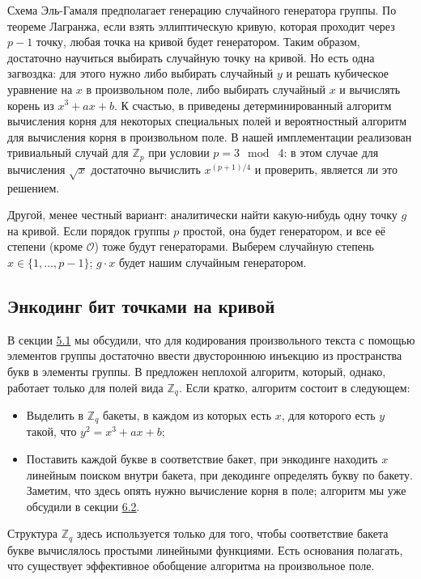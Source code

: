 \documentclass[a4paper,14pt]{extarticle}
\begin{document}
Схема Эль-Гамаля предполагает генерацию случайного генератора группы. По теореме
Лагранжа, если взять эллиптическую кривую, которая проходит через $p - 1$ точку,
любая точка на кривой будет генератором. Таким образом, достаточно научиться
выбирать случайную точку на кривой. Но есть одна загвоздка: для этого нужно либо
выбирать случайный $y$ и решать кубическое уравнение на $x$ в произвольном поле,
либо выбирать случайный $x$ и вычислять корень из $x^3 + a x + b$. К счастью, в
\cite{sqrt} приведены детерминированный алгоритм вычисления корня для некоторых
специальных полей и вероятностный алгоритм для вычисления корня в произвольном
поле. В нашей имплементации реализован тривиальный случай для $\mathbb{Z}_p$
при условии $p = 3 \mod \;4$: в этом случае для вычисления $\sqrt{x}$ достаточно
вычислить $x^{(p + 1) / 4}$ и проверить, является ли это решением.

Другой, менее честный вариант: аналитически найти какую-нибудь одну точку $g$ на
кривой. Если порядок группы $p$ простой, она будет генератором, и все её степени
(кроме $\mathcal{O}$) тоже будут генераторами. Выберем случайную степень
$x \in \{1,\dots,p - 1\}$; $g \cdot x$ будет нашим случайным генератором.

\subsection{Энкодинг бит точками на кривой}

В секции \hyperref[stream]{5.1} мы обсудили, что для кодирования произвольного
текста с помощью
элементов группы достаточно ввести двустороннюю инъекцию из пространства букв в
элементы группы. В \cite{encoding} предложен неплохой алгоритм, который, однако,
работает только для полей вида $\mathbb{Z}_q$. Если кратко, алгоритм состоит в следующем:

\begin{itemize}
    \item Выделить в $\mathbb{Z}_q$ бакеты, в каждом из которых есть $x$, для
        которого есть $y$ такой, что $y^2 = x^3 + a x + b$;
    \item Поставить каждой букве в соответствие бакет, при энкодинге находить
        $x$ линейным поиском внутри бакета, при декодинге определять букву по
        бакету. Заметим, что здесь опять нужно вычисление корня в поле; алгоритм
        мы уже обсудили в секции \hyperref[generator]{6.2}.
\end{itemize}

Структура $\mathbb{Z}_q$ здесь используется только для того, чтобы соответствие
бакета букве вычислялось простыми линейными функциями. Есть основания полагать,
что существует эффективное обобщение алгоритма на произвольное поле.
\end{document}
